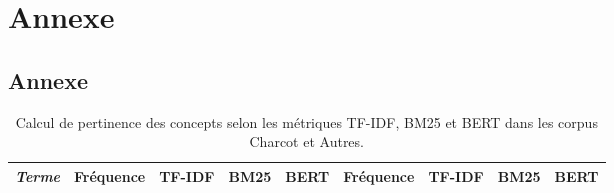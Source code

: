 \part*{Annexe}


\chapter{Annexe}



\makeatletter
\renewcommand{\thesection}{\@arabic\c@section}
\makeatother

\setcounter{section}{0}


\begin{landscape}
\thispagestyle{empty}
\begin{table}[]
\centering
\begin{tabular}{|l|cccc|cccc|}
\hline
\textit{Terme} & Fréquence & \textsc{TF-IDF} & \textsc{BM25} & \textsc{BERT} & Fréquence & \textsc{TF-IDF} & \textsc{BM25} & \textsc{BERT} \\
\hline
\end{tabular}
\caption{Calcul de pertinence des concepts selon les métriques \textsc{TF-IDF}, \textsc{BM25} et \textsc{BERT} dans les corpus \og{}Charcot\fg{} et \og{}Autres\fg{}.}
\end{table}
\vfill
\raisebox{}{\makebox[\linewidth]{\thepage}}



\label{tab:calculs_stat}
\end{landscape}


